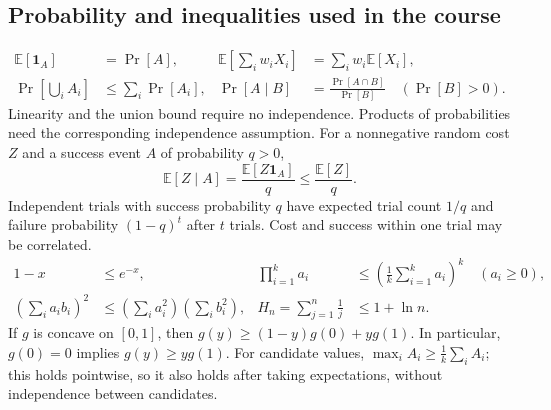 \subsection{Probability and inequalities used in the course}
\begin{align*}
\mathbb E[\mathbf1_A]&=\Pr[A], &
\mathbb E\!\left[\sum_iw_iX_i\right]&=\sum_iw_i\mathbb E[X_i],\\
\Pr\!\left[\bigcup_i A_i\right]&\le\sum_i\Pr[A_i], &
\Pr[A\mid B]&=\frac{\Pr[A\cap B]}{\Pr[B]}\quad(\Pr[B]>0).
\end{align*}
Linearity and the union bound require no independence. Products of probabilities need
the corresponding independence assumption. For a nonnegative random cost $Z$ and a success
event $A$ of probability $q>0$,
\[
\mathbb E[Z\mid A]=\frac{\mathbb E[Z\mathbf1_A]}q\le\frac{\mathbb E[Z]}q.
\]
Independent trials with success probability $q$ have expected trial count $1/q$ and
failure probability $(1-q)^t$ after $t$ trials. Cost and success within one trial may be correlated.
\begin{align*}
1-x&\le e^{-x}, &
\prod_{i=1}^k a_i&\le\left(\frac1k\sum_{i=1}^k a_i\right)^k\quad(a_i\ge0),\\
\left(\sum_i a_ib_i\right)^2&\le\left(\sum_i a_i^2\right)\left(\sum_i b_i^2\right), &
H_n=\sum_{j=1}^n\frac1j&\le1+\ln n.
\end{align*}
If $g$ is concave on $[0,1]$, then
$g(y)\ge(1-y)g(0)+yg(1)$. In particular, $g(0)=0$ implies $g(y)\ge yg(1)$.
For candidate values, $\max_i A_i\ge\frac1k\sum_i A_i$; this holds pointwise, so it also
holds after taking expectations, without independence between candidates.

